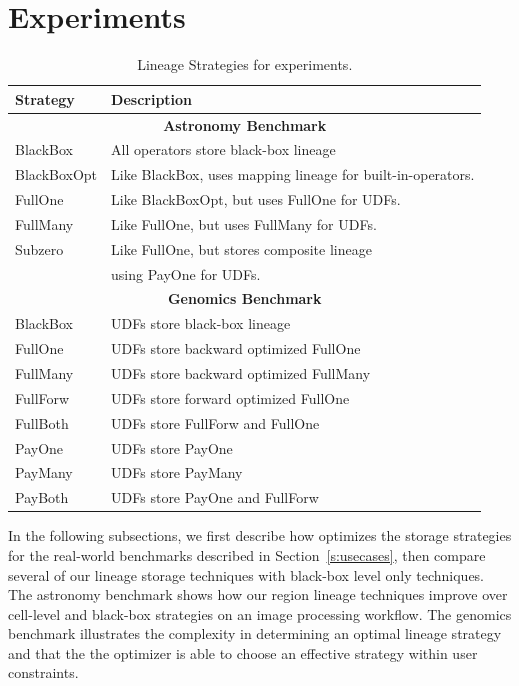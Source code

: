 \section{Experiments}
\label{s:expt}




\begin{table}[tb]
\begin{center}
\footnotesize
\caption{Lineage Strategies for experiments.}
  \begin{tabular}{ | l | l | }
    \hline
    {\bf Strategy} &  {\bf Description} \\ \hline \hline
    \multicolumn{2}{|c|}{\bf Astronomy Benchmark} \\ \hline
    BlackBox & All operators store black-box lineage \\ \hline
    BlackBoxOpt & Like BlackBox, uses mapping lineage for built-in-operators.\\ \hline
    FullOne & Like BlackBoxOpt, but uses FullOne for UDFs.\\ \hline
    FullMany & Like FullOne, but uses FullMany for UDFs.\\ \hline
    Subzero & Like FullOne, but stores composite lineage\\
            & using PayOne for UDFs.\\ \hline
    \multicolumn{2}{|c|}{\bf Genomics Benchmark} \\ \hline
    BlackBox & UDFs store black-box lineage \\ \hline
    FullOne & UDFs store backward optimized FullOne\\ \hline
    FullMany & UDFs store backward optimized FullMany\\ \hline
    FullForw & UDFs store forward optimized FullOne\\ \hline
    FullBoth & UDFs store FullForw and FullOne \\ \hline
    PayOne & UDFs store PayOne\\ \hline
    PayMany & UDFs store PayMany\\ \hline
    PayBoth & UDFs store PayOne and FullForw\\ \hline
\end{tabular}
\end{center}
\label{t:strats}
\end{table}

In the following subsections, we first describe how \sys{} optimizes the
storage strategies for the real-world benchmarks described in
Section~\ref{s:usecases}, then compare several of  our lineage storage
techniques with black-box level only techniques.  The astronomy benchmark shows
how our region lineage techniques improve over cell-level and black-box
strategies on  an image processing workflow.   The genomics benchmark
illustrates the complexity in determining an optimal lineage strategy and that
the the optimizer is able to  choose an effective strategy within user
constraints.


